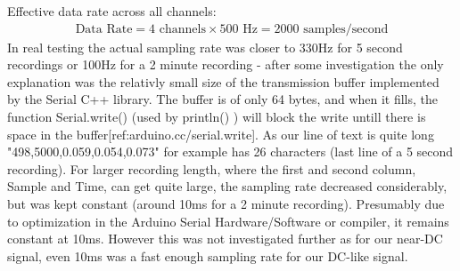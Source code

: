 Effective data rate across all channels:
\begin{equation} \label{EffectiveDATArate}
  \begin{split}
\text{Data Rate} = 4 \text{ channels} \times 500 \text{ Hz} = 2000 \text{ samples/second}
\end{split}
\end{equation}
In real testing the actual sampling rate was closer to 330Hz for 5 second recordings or 100Hz for a 2 minute recording - after some investigation the only explanation was the relativly small size of the transmission buffer implemented by the Serial C++ library. The buffer is of only 64 bytes, and when it fills, the function Serial.write() (used by println() ) will block the write untill there is space in the buffer[ref:arduino.cc/serial.write]. As our line of text is quite long "498,5000,0.059,0.054,0.073" for example has 26 characters (last line of a 5 second recording). For larger recording length, where the first and second column, Sample and Time, can get quite large, the sampling rate decreased considerably, but was kept constant (around 10ms for a 2 minute recording). Presumably due to optimization in the Arduino Serial Hardware/Software or compiler, it remains constant at 10ms. However this was not investigated further as for our near-DC signal, even 10ms was a fast enough sampling rate for our DC-like signal.


